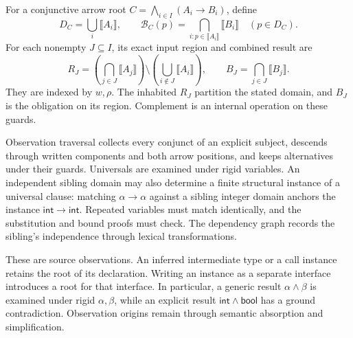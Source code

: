 \documentclass[10pt,a4paper]{article}
\newcommand{\sem}[1]{\llbracket #1\rrbracket}
\newcommand{\Int}{\mathsf{int}}
\newcommand{\Bool}{\mathsf{bool}}
\theoremstyle{remark}
\begin{document}
For a conjunctive arrow root $C=\bigwedge_{i\in I}(A_i\to B_i)$, define
\[
 D_C=\bigcup_i\sem{A_i},\qquad
 \mathcal B_C(p)=\bigcap_{i:p\in\sem{A_i}}\sem{B_i}\quad(p\in D_C).
\]
For each nonempty $J\subseteq I$, its exact input region and combined result are
\begin{equation}\label{eq:regions}
 R_J=\left(\bigcap_{j\in J}\sem{A_j}\right)
       \setminus\left(\bigcup_{i\notin J}\sem{A_i}\right),
 \qquad
 B_J=\bigcap_{j\in J}\sem{B_j}.
\end{equation}
They are indexed by $w,\rho$. The inhabited $R_J$ partition the stated domain,
and $B_J$ is the obligation on its region. Complement is an internal operation
on these guards.

Observation traversal collects every conjunct of an explicit subject, descends
through written components and both arrow positions, and keeps alternatives
under their guards. Universals are examined under rigid variables. An
independent sibling domain may also determine a finite structural instance of
a universal clause: matching $\alpha\to\alpha$ against a sibling integer
domain anchors the instance $\Int\to\Int$. Repeated variables must match
identically, and the substitution and bound proofs must check. The dependency
graph records the sibling's independence through lexical transformations.

These are source observations. An inferred intermediate type or a call instance
retains the root of its declaration. Writing an instance as a separate interface
introduces a root for that interface. In particular, a generic result
$\alpha\land\beta$ is examined under rigid $\alpha,\beta$, while an
explicit result $\Int\land\Bool$ has a ground contradiction. Observation
origins remain through semantic absorption and simplification.
\end{document}
